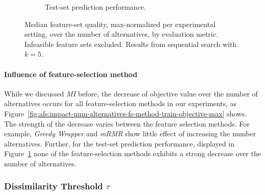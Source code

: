 \documentclass{article}
\theoremstyle{definition}
\begin{document}
\begin{figure}[htb]
\begin{subfigure}[t]{0.48\textwidth}
		\caption{Test-set prediction performance.}
		\label{fig:afs:impact-num-alternatives-fs-method-decision-tree-test-mcc-max}
	\end{subfigure}
	\caption{
		Median feature-set quality, max-normalized per experimental setting, over the number of alternatives, by evaluation metric.
		Infeasible feature sets excluded.
		Results from sequential search with $k=5$.
	}
	\label{fig:afs:impact-num-alternatives-fs-method-quality}
\end{figure}

\paragraph{Influence of feature-selection method}

While we discussed \emph{MI} before, the decrease of objective value over the number of alternatives occurs for all feature-selection methods in our experiments, as Figure~\ref{fig:afs:impact-num-alternatives-fs-method-train-objective-max} shows.
The strength of the decrease varies between the feature selection methods.
For example, \emph{Greedy Wrapper} and \emph{mRMR} show little effect of increasing the number alternatives.
Further, for the test-set prediction performance, displayed in Figure~\ref{fig:afs:impact-num-alternatives-fs-method-decision-tree-test-mcc-max} none of the feature-selection methods exhibits a strong decrease over the number of alternatives.

\subsubsection{Dissimilarity Threshold \texorpdfstring{$\tau$}{}} %
\label{sec:afs:evaluation:search:tau}
\end{document}
